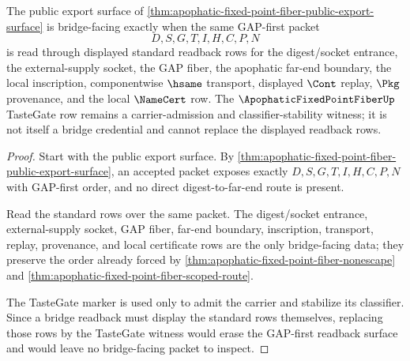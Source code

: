 \begin{theorem}
\label{thm:apophatic-fixed-point-fiber-bridge-readback}
The public export surface of \autoref{thm:apophatic-fixed-point-fiber-public-export-surface} is bridge-facing exactly when the same GAP-first packet
$$
D,S,G,T,I,H,C,P,N
$$
is read through displayed standard readback rows for the digest/socket entrance, the external-supply socket, the GAP fiber, the apophatic far-end boundary, the local inscription, componentwise $\hsame$ transport, displayed $\Cont$ replay, $\Pkg$ provenance, and the local $\NameCert$ row. The $\ApophaticFixedPointFiberUp$ TasteGate row remains a carrier-admission and classifier-stability witness; it is not itself a bridge credential and cannot replace the displayed readback rows.
\end{theorem}
\begin{proof}
Start with the public export surface. By \autoref{thm:apophatic-fixed-point-fiber-public-export-surface}, an accepted packet exposes exactly $D,S,G,T,I,H,C,P,N$ with GAP-first order, and no direct digest-to-far-end route is present.

Read the standard rows over the same packet. The digest/socket entrance, external-supply socket, GAP fiber, far-end boundary, inscription, transport, replay, provenance, and local certificate rows are the only bridge-facing data; they preserve the order already forced by \autoref{thm:apophatic-fixed-point-fiber-nonescape} and \autoref{thm:apophatic-fixed-point-fiber-scoped-route}.

The TasteGate marker is used only to admit the carrier and stabilize its classifier. Since a bridge readback must display the standard rows themselves, replacing those rows by the TasteGate witness would erase the GAP-first readback surface and would leave no bridge-facing packet to inspect.
\end{proof}

